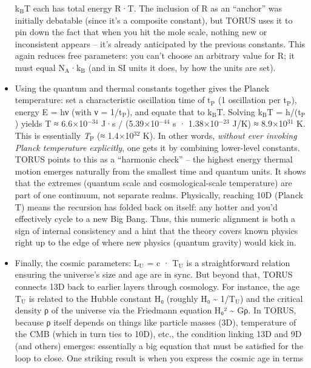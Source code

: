 \documentclass[]{article}
\newcommand{\subscript}[1]{\ensuremath{_{\mathrm{#1}}}}
\newcommand{\superscript}[1]{\ensuremath{^{\mathrm{#1}}}}
\begin{document}
\begin{itemize}
  k\subscript{B}T each has
  total energy R·T. The inclusion of R as an ``anchor'' was initially
  debatable (since it's a composite constant), but TORUS uses it to pin
  down the fact that when you hit the mole scale, nothing new or
  inconsistent appears -- it's already anticipated by the previous
  constants​. This again reduces free parameters: you can't choose an
  arbitrary value for R; it must equal
  N\subscript{A}·k\subscript{B}
  (and in SI units it does, by how the units are set).
\item
  Using the quantum and thermal constants together gives the Planck
  temperature: set a characteristic oscillation time of
  t\subscript{P} (1
  oscillation per
  t\subscript{P}), energy E
  = hν (with ν =
  1/t\subscript{P}), and
  equate that to
  k\subscript{B}T. Solving
  k\subscript{B}T =
  h/(t\subscript{P}) yields
  T ≈ 6.6×10\superscript{−34} J·s / (5.39×10\superscript{−44} s · 1.38×10\superscript{−23} J/K) ≈
  8.9×10\superscript{31} K​. This is essentially
  \emph{T\subscript{P}} (≈
  1.4×10\superscript{32} K)​. In other words, \emph{without ever invoking Planck
  temperature explicitly}, one gets it by combining lower-level
  constants. TORUS points to this as a ``harmonic check'' -- the highest
  energy thermal motion emerges naturally from the smallest time and
  quantum units​. It shows that the extremes (quantum scale and
  cosmological-scale temperature) are part of one continuum, not
  separate realms. Physically, reaching 10D (Planck T) means the
  recursion has folded back on itself: any hotter and you'd effectively
  cycle to a new Big Bang. Thus, this numeric alignment is both a sign
  of internal consistency and a hint that the theory covers known
  physics right up to the edge of where new physics (quantum gravity)
  would kick in.
\item
  Finally, the cosmic parameters:
  L\subscript{U} = c ·
  T\subscript{U} is a
  straightforward relation ensuring the universe's size and age are in
  sync​. But beyond that, TORUS connects 13D back to earlier layers
  through cosmology. For instance, the age
  T\subscript{U} is related
  to the Hubble constant H₀ (roughly H₀ \textasciitilde{}
  1/T\subscript{U}) and the
  critical density ρ of the universe via the Friedmann equation H₀²
  \textasciitilde{} Gρ​. In TORUS, because ρ itself depends on things
  like particle masses (3D), temperature of the CMB (which in turn ties
  to 10D), etc., the condition linking 13D and 9D (and others) emerges:
  essentially a big equation that must be satisfied for the loop to
  close. One striking result is when you express the cosmic age in terms

\end{itemize}
\end{document}
